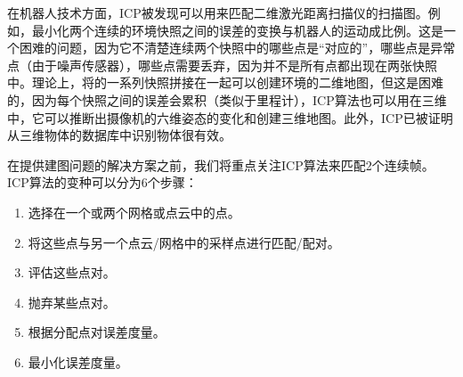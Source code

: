 
在机器人技术方面，ICP被发现可以用来匹配二维激光距离扫描仪的扫描图。例如，最小化两个连续的环境快照之间的误差的变换与机器人的运动成比例。这是一个困难的问题，因为它不清楚连续两个快照中的哪些点是“对应的”，哪些点是异常点（由于噪声传感器），哪些点需要丢弃，因为并不是所有点都出现在两张快照中。理论上，将的一系列快照拼接在一起可以创建环境的二维地图，但这是困难的，因为每个快照之间的误差会累积（类似于里程计），ICP算法也可以用在三维中，它可以推断出摄像机的六维姿态的变化和创建三维地图。此外，ICP已被证明从三维物体的数据库中识别物体很有效。


在提供建图问题的解决方案之前，我们将重点关注ICP算法来匹配2个连续帧。 ICP算法的变种可以分为6个步骤：

\begin{enumerate}

\item 选择在一个或两个网格或点云中的点。
\item 将这些点与另一个点云/网格中的采样点进行匹配/配对。
\item 评估这些点对。
\item 抛弃某些点对。
\item 根据分配点对误差度量。
\item 最小化误差度量。
\end{enumerate}

